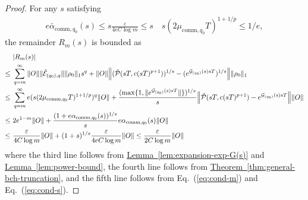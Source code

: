 \documentclass[aps,pra,reprint,groupedaddress,floatfix]{revtex4-2}
\newcommand{\eq}[1]{(\ref{eq:#1})}
\newcommand{\thm}[1]{\hyperref[thm:#1]{Theorem~\ref*{thm:#1}}}
\newcommand{\lem}[1]{\hyperref[lem:#1]{Lemma~\ref*{lem:#1}}}
\newcommand{\G}{\mathcal{G}}
\newcommand{\E}{\mathcal{E}}
\newcommand{\eps}{\varepsilon}
\newcommand{\mc}{\mathcal}
\begin{document}
\begin{proof}
   
    For any $s$ satisfying \begin{align}
    \label{eq:cond-s}
        e\bar\alpha_{\mathrm{comm},q_0}(s)\le s\frac{\eps}{4eC \log m} \le s \quad s(2\mu_{\mathrm{comm},q_0}T)^{1+1/p} \le 1/e,
    \end{align} the remainder $R_m(s)$ is bounded as \begin{align*}
        &|R_m(s)| \\
        \le ~&\sum_{q=m}^{\infty}\|O\|\|\tilde{\E}_{(q_0),q}\|\|\rho_0\|_1 s^q + \|O\|\Big\|(\tilde{\mc P}(sT, c(sT)^{p+1}))^{1/s}-(e^{\G_{(q_0)}(s)sT})^{1/s}\Big\|\|\rho_0\|_1 \\
        \le ~& \sum_{q=m}^{\infty} e(s(2\mu_{\mathrm{comm},q_0} T)^{1+1/p})^{q}\|O\|+\frac{(\max\{1, \|e^{\G_{(q_0)}(s) sT}\|\})^{1/s}}{s}\Bigl\|\tilde{\mc P}(sT, c(sT)^{p+1})-e^{\G_{(q_0)}(s)sT}\Bigr\|\|O\|\\
        \le ~&2e^{1-m} \|O\|+ \frac{(1+e\alpha_{\mathrm{comm},q_0}(s))^{1/s}}{s}e\alpha_{\mathrm{comm},q_0}(s)\|O\| \\
        \le ~& \frac{\eps}{4C\log m} \|O\|+(1+s)^{1/s}\frac{\eps}{4eC\log m}\|O\| \le \frac{\eps}{2C\log m} \|O\|
    \end{align*}
    where the third line follows from \lem{expansion-exp-G(s)} and \lem{power-bound}, the fourth line follows from 
    \thm{general-bch-truncation}, and the fifth line follows from Eq.~\eq{cond-m} and Eq.~\eq{cond-s}.
    

\end{proof}
\end{document}

